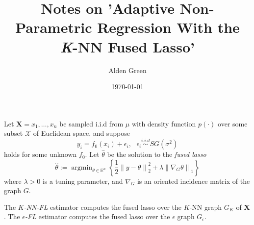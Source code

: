 \documentclass{article}
\newcommand{\Reals}{\mathbb{R}}
\newcommand{\norm}[1]{\left\lVert#1\right\rVert}
\newcommand{\set}[1]{\left\{#1\right\}}
\newcommand{\1}{\mathbb{I}}
\DeclareMathOperator*{\argmin}{argmin}
\newcommand{\Xbf}{\mathbf{X}}
\newcommand{\Xset}{\mathcal{X}}
\theoremstyle{alden}
\theoremstyle{aldenthm}
\theoremstyle{definition}
\theoremstyle{remark}
\begin{document}
	
\title{Notes on 'Adaptive Non-Parametric Regression With the \emph{K}-NN Fused Lasso'}
\author{Alden Green}
\date{\today}
\maketitle

Let $\Xbf = x_1, \ldots, x_n$ be sampled i.i.d from $\mu$ with density function $p(\cdot)$ over some subset $\Xset$ of Euclidean space, and suppose
\begin{equation*}
y_i = f_0(x_i) + \epsilon_i, ~~~\epsilon_i \overset{i.i.d}{\sim}SG(\sigma^2)
\end{equation*}
holds for some unknown $f_0$. Let $\widehat{\theta}$ be the solution to the \emph{fused lasso}
\begin{equation*}
\widehat{\theta} := \argmin_{\theta \in \Reals^n} \set{\frac{1}{2} \norm{y - \theta}_2^2 + \lambda \norm{\nabla_G \theta}_1} 
\end{equation*}
where $\lambda > 0$ is a tuning parameter, and $\nabla_G$ is an oriented incidence matrix of the graph $G$. 

The \emph{$K$-NN-FL} estimator computes the fused lasso over the $K$-NN graph $G_K$ of $\Xbf$. The \emph{$\epsilon$-FL} estimator computes the fused lasso over the $\epsilon$ graph $G_{\epsilon}$.
\end{document}

